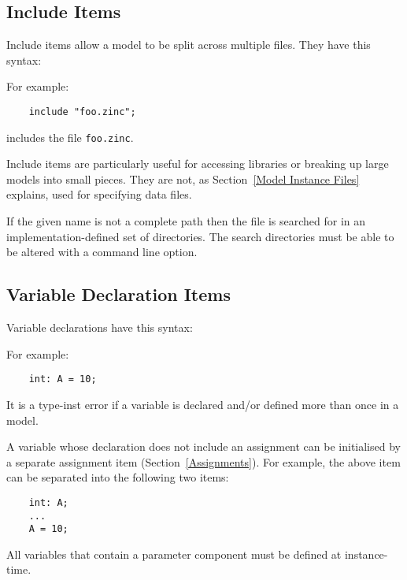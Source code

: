 \documentclass[10pt]{scrartcl}
\begin{document}
\subsection{Include Items}
     \label{Include Items}
Include items allow a model to be split across multiple files.  They have
this syntax:
\begin{productions}
    \RuleIncludeItem
\end{productions}
For example:
\begin{verbatim}
    include "foo.zinc";
\end{verbatim}
includes the file \texttt{foo.zinc}.

Include items are particularly useful for accessing libraries or breaking up
large models into small pieces.  They are not, as Section~\ref{Model
Instance Files} explains, used for specifying data files.

If the given name is not a complete path then the file is searched for in an
implementation-defined set of directories.  The search directories must be
able to be altered with a command line option.

\subsection{Variable Declaration Items}
     \label{Declarations}
Variable declarations have this syntax:
\begin{productions}
    \RuleVarDeclItem
\end{productions}
For example:
\begin{verbatim}
    int: A = 10;
\end{verbatim}

It is a type-inst error if a variable is declared and/or defined more than
once in a model.

A variable whose declaration does not include an assignment can be
initialised by a separate assignment item (Section~\ref{Assignments}).  For
example, the above item can be separated into the following two items:
\begin{verbatim}
    int: A;
    ...
    A = 10;
\end{verbatim}

All variables that contain a parameter component must be defined at
instance-time.
\end{document}
